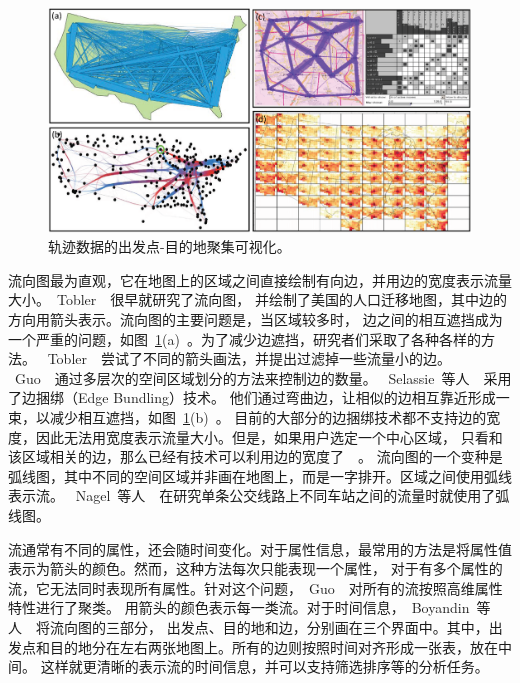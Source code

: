 \documentclass[12pt,twocolumn]{article}
\begin{document}
\begin{figure}[!htb]
\centering
\includegraphics[width=0.85\linewidth]{images/aggregation_ss.eps}
\caption{\label{fig:aggregation_ss}轨迹数据的出发点-目的地聚集可视化。
}
\end{figure}

流向图最为直观，它在地图上的区域之间直接绘制有向边，并用边的宽度表示流量大小。~Tobler~\citep{Tobler1987}~很早就研究了流向图，
并绘制了美国的人口迁移地图，其中边的方向用箭头表示。流向图的主要问题是，当区域较多时，
边之间的相互遮挡成为一个严重的问题，如图~\ref{fig:aggregation_ss}(a)~。为了减少边遮挡，研究者们采取了各种各样的方法。
~Tobler~\citep{Tobler1987}~尝试了不同的箭头画法，并提出过滤掉一些流量小的边。
~Guo~\citep{Guo2009}~通过多层次的空间区域划分的方法来控制边的数量。
~Selassie~等人~\citep{SelassieHH2011}~采用了边捆绑（Edge Bundling）技术。
他们通过弯曲边，让相似的边相互靠近形成一束，以减少相互遮挡，如图~\ref{fig:aggregation_ss}(b)~。
目前的大部分的边捆绑技术都不支持边的宽度，因此无法用宽度表示流量大小。但是，如果用户选定一个中心区域，
只看和该区域相关的边，那么已经有技术可以利用边的宽度了~\citep{VerbeekKS2011}~。
流向图的一个变种是弧线图，其中不同的空间区域并非画在地图上，而是一字排开。区域之间使用弧线表示流。
~Nagel~等人~\citep{NagelMDMKK2014}~在研究单条公交线路上不同车站之间的流量时就使用了弧线图。

流通常有不同的属性，还会随时间变化。对于属性信息，最常用的方法是将属性值表示为箭头的颜色。然而，这种方法每次只能表现一个属性，
对于有多个属性的流，它无法同时表现所有属性。针对这个问题，~Guo~\citep{Guo2009}~对所有的流按照高维属性特性进行了聚类。
用箭头的颜色表示每一类流。对于时间信息，~Boyandin~等人~\citep{BoyandinBBL2011}~将流向图的三部分，
出发点、目的地和边，分别画在三个界面中。其中，出发点和目的地分在左右两张地图上。所有的边则按照时间对齐形成一张表，放在中间。
这样就更清晰的表示流的时间信息，并可以支持筛选排序等的分析任务。
\end{document}
